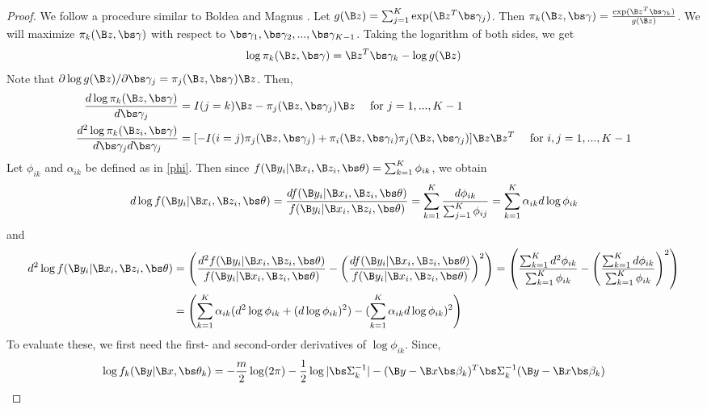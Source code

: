 \begin{proof}
We follow a procedure similar to Boldea and Magnus \cite{boldea2009}. Let $g(\B  z)=\sum_{j=1}^{K}\exp(\B  z^{T}\bs \gamma_{j})$. Then $\pi_{k}(\B z,\bs\gamma)=\frac{\exp( \B  z^{T}\bs\gamma_{k})}{g(\B  z)}$. We will maximize $\pi_{k}(\B z,\bs\gamma)$ with respect to $\bs\gamma_{1},\bs\gamma_{2},...,\bs\gamma_{K-1}$. Taking the logarithm of both sides, we get
\begin{align}
\log \pi_{k}(\B z,\bs\gamma)=\B z^{T}\bs\gamma_{k} - \log g(\B z)
\label{wts}
\end{align}
Note that $\partial\log g(\B z)/\partial \bs \gamma_{j}=\pi_{j}(\B z,\bs\gamma) \B z$. Then,
\begin{align}
\frac{d\log\pi_{k}(\B z,\bs\gamma)}{d\bs\gamma_{j}}&=I(j=k)\B z-\pi_{j}(\B z,\bs\gamma_{j})\B z\quad\text{ for }j=1,...,K-1\nonumber\\
\frac{d^{2}\log\pi_{k}(\B z_{i},\bs\gamma)}{d\bs\gamma_{j}d\bs\gamma_{j}}&=[-I(i=j)\pi_{j}(\B z,\bs\gamma_{j})+\pi_{i}(\B z,\bs\gamma_{i})\pi_{j}(\B z,\bs\gamma_{j})]\B z\B z^{T}\quad\text{ for }i,j=1,...,K-1
\label{logpi}
\end{align}
Let $\phi_{ik}$ and $\alpha_{ik}$ be defined as in \eqref{phi}. Then since $f(\B y_{i}|\B x_{i},\B z_{i},\bs\theta)=\sum^{K}_{k=1}\phi_{ik}$, we obtain
\begin{align}
d\log f(\B y_{i}|\B x_{i},\B z_{i},\bs\theta)=\frac{d f(\B y_{i}|\B x_{i},\B z_{i},\bs\theta)}{f(\B y_{i}|\B x_{i},\B z_{i},\bs\theta)}=\sum^{K}_{k=1}\frac{d\phi_{ik}}{\sum^{K}_{j=1}\phi_{ij}}=\sum^{K}_{k=1}\alpha_{ik}d\log \phi_{ik}\label{dlogf}
\end{align}
and 
\begin{align}\label{d2logf}
d^{2}\log f(\B y_{i}|\B x_{i},\B z_{i},\bs\theta)&=\left(\frac{d^{2} f(\B y_{i}|\B x_{i},\B z_{i},\bs\theta)}{f(\B y_{i}|\B x_{i},\B z_{i},\bs\theta)}-\left(\frac{d f(\B y_{i}|\B x_{i},\B z_{i},\bs\theta)}{f(\B y_{i}|\B x_{i},\B z_{i},\bs\theta)}\right)^{2}\right)=\left(\frac{\sum^{K}_{k=1}d^{2}\phi_{ik}}{\sum^{K}_{k=1}\phi_{ik}}-\left(\frac{\sum^{K}_{k=1}d \phi_{ik}}{\sum^{K}_{k=1}\phi_{ik}}\right)^{2}\right)\nonumber\\
&=\left(\sum^{K}_{k=1}\alpha_{ik}(d^{2}\log \phi_{ik}+(d\log \phi_{ik})^{2})-(\sum^{K}_{k=1}\alpha_{ik}d\log \phi_{ik})^{2}\right)
\end{align}
To evaluate these, we first need the first- and second-order derivatives of $\log \phi_{ik}$.  Since, 
\begin{align*}
\log f_{k}(\B y|\B x,\bs\theta_{k})=-\frac{m}{2}\log(2\pi)-\frac{1}{2}\log |\bs\Sigma_{k}^{-1}|-(\B y-\B x\bs \beta_{k})^{T}\bs\Sigma_{k}^{-1}(\B y-\B x\bs\beta_{k})

\end{align*}
\end{proof}
